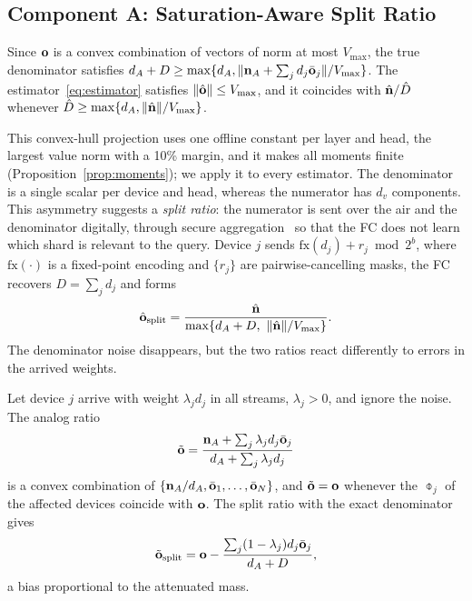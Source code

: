 \subsection{Component A: Saturation-Aware Split Ratio}

\begin{lemma}\label{lem:projection}
Since $\mathbf{o}$ is a convex combination of vectors of norm at most $V_{\max}$, the true denominator satisfies $d_A+D\ge\max\{d_A,\|\mathbf{n}_A+\sum_jd_j\bar{\mathbf{o}}_j\|/V_{\max}\}$. The estimator~\eqref{eq:estimator} satisfies $\|\hat{\mathbf{o}}\|\le V_{\max}$, and it coincides with $\hat{\mathbf{n}}/\hat D$ whenever $\hat D\ge\max\{d_A,\|\hat{\mathbf{n}}\|/V_{\max}\}$.
\end{lemma}

This convex-hull projection uses one offline constant per layer and head, the largest value norm with a 10\% margin, and it makes all moments finite (Proposition~\ref{prop:moments}); we apply it to every estimator. The denominator is a single scalar per device and head, whereas the numerator has $d_v$ components. This asymmetry suggests a \emph{split ratio}: the numerator is sent over the air and the denominator digitally, through secure aggregation~\cite{bonawitz2017secagg} so that the FC does not learn which shard is relevant to the query. Device $j$ sends $\mathrm{fx}(d_j)+r_j \bmod 2^{b}$, where $\mathrm{fx}(\cdot)$ is a fixed-point encoding and $\{r_j\}$ are pairwise-cancelling masks, the FC recovers $D=\sum_jd_j$ and forms
\begin{equation}
\hat{\mathbf{o}}_{\rm split}=\frac{\hat{\mathbf{n}}}{\max\{d_A+D,\ \|\hat{\mathbf{n}}\|/V_{\max}\}}.
\label{eq:split}
\end{equation}
The denominator noise disappears, but the two ratios react differently to errors in the arrived weights.

\begin{proposition}\label{prop:selfconsistency}
Let device $j$ arrive with weight $\lambda_jd_j$ in all streams, $\lambda_j>0$, and ignore the noise. The analog ratio
\begin{equation}
\tilde{\mathbf{o}}=\frac{\mathbf{n}_A+\sum_j\lambda_jd_j\bar{\mathbf{o}}_j}{d_A+\sum_j\lambda_jd_j}
\end{equation}
is a convex combination of $\{\mathbf{n}_A/d_A,\bar{\mathbf{o}}_1,\dots,\bar{\mathbf{o}}_N\}$, and $\tilde{\mathbf{o}}=\mathbf{o}$ whenever the $\obar_j$ of the affected devices coincide with $\mathbf{o}$. The split ratio with the exact denominator gives
\begin{equation}
\tilde{\mathbf{o}}_{\rm split}=\mathbf{o}-\frac{\sum_j(1-\lambda_j)d_j\bar{\mathbf{o}}_j}{d_A+D},
\end{equation}
a bias proportional to the attenuated mass.
\end{proposition}

